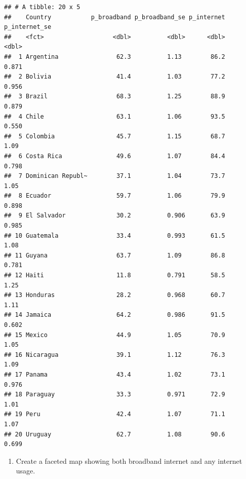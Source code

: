 \documentclass[
]{krantz}
\providecommand{\tightlist}{%
  \setlength{\itemsep}{0pt}\setlength{\parskip}{0pt}}
\begin{document}
\begin{verbatim}
## # A tibble: 20 x 5
##    Country           p_broadband p_broadband_se p_internet p_internet_se
##    <fct>                   <dbl>          <dbl>      <dbl>         <dbl>
##  1 Argentina                62.3          1.13        86.2         0.871
##  2 Bolivia                  41.4          1.03        77.2         0.956
##  3 Brazil                   68.3          1.25        88.9         0.879
##  4 Chile                    63.1          1.06        93.5         0.550
##  5 Colombia                 45.7          1.15        68.7         1.09 
##  6 Costa Rica               49.6          1.07        84.4         0.798
##  7 Dominican Republ~        37.1          1.04        73.7         1.05 
##  8 Ecuador                  59.7          1.06        79.9         0.898
##  9 El Salvador              30.2          0.906       63.9         0.985
## 10 Guatemala                33.4          0.993       61.5         1.08 
## 11 Guyana                   63.7          1.09        86.8         0.781
## 12 Haiti                    11.8          0.791       58.5         1.25 
## 13 Honduras                 28.2          0.968       60.7         1.11 
## 14 Jamaica                  64.2          0.986       91.5         0.602
## 15 Mexico                   44.9          1.05        70.9         1.05 
## 16 Nicaragua                39.1          1.12        76.3         1.09 
## 17 Panama                   43.4          1.02        73.1         0.976
## 18 Paraguay                 33.3          0.971       72.9         1.01 
## 19 Peru                     42.4          1.07        71.1         1.07 
## 20 Uruguay                  62.7          1.08        90.6         0.699
\end{verbatim}

\begin{enumerate}
\def\labelenumi{\arabic{enumi}.}
\setcounter{enumi}{1}
\tightlist
\item
  Create a faceted map showing both broadband internet and any internet usage.
\end{enumerate}
\end{document}
